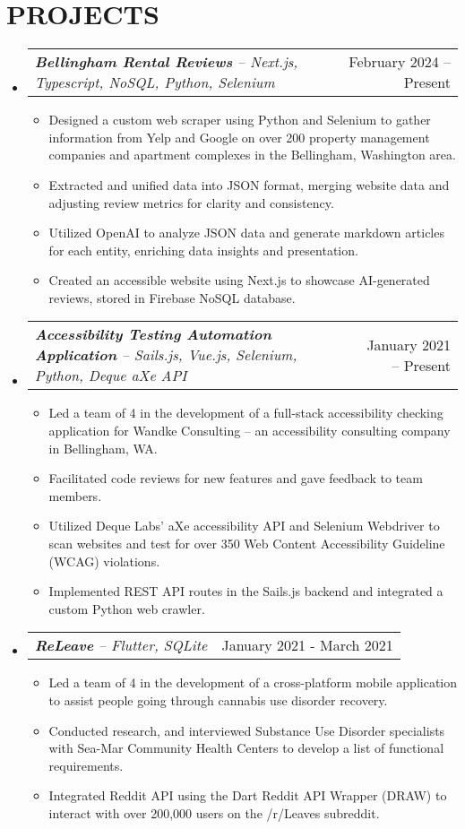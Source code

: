 \documentclass[letterpaper,11pt]{article}
\makeatletter
\newcommand{\resumeItem}[1]{
    \item\small{
            {#1 \vspace{-1pt}}
        }
    }
\newcommand{\resumeProjectHeading}[2]{
    \item
        \begin{tabular*}{\textwidth}{l@{\extracolsep{\fill}}r}
            \textit{\small#1} & {\color{dark-grey}\small #2}\vspace{2pt} \\
        \end{tabular*}\vspace{-5pt}
    }
\newcommand{\resumeSubHeadingListStart}{\begin{itemize}[leftmargin=0in, label={}]}
\newcommand{\resumeSubHeadingListEnd}{\end{itemize}}
\newcommand{\resumeItemListStart}{\begin{itemize}}
\newcommand{\resumeItemListEnd}{\end{itemize}\vspace{0pt}}
\makeatother
\begin{document}
\section{PROJECTS}
\resumeSubHeadingListStart
    \resumeProjectHeading{\textbf{Bellingham Rental Reviews} -- Next.js, Typescript, NoSQL, Python, Selenium}{February 2024 -- Present}
    \resumeItemListStart
        \resumeItem{Designed a custom web scraper using Python and Selenium to gather information from Yelp and Google on over 200 property management companies and apartment complexes in the Bellingham, Washington area.}
        \resumeItem{Extracted and unified data into JSON format, merging website data and adjusting review metrics for clarity and consistency.}
        \resumeItem{Utilized OpenAI to analyze JSON data and generate markdown articles for each entity, enriching data insights and presentation.}
        \resumeItem{Created an accessible website using Next.js to showcase AI-generated reviews, stored in Firebase NoSQL database.}
    \resumeItemListEnd

    \resumeProjectHeading{\textbf{Accessibility Testing Automation Application} -- Sails.js, Vue.js, Selenium, Python, Deque aXe API}{January 2021 -- Present}
    \resumeItemListStart
        \resumeItem{Led a team of 4 in the development of a full-stack accessibility checking application for Wandke Consulting -- an accessibility consulting company in Bellingham, WA.}
        \resumeItem{Facilitated code reviews for new features and gave feedback to team members.}
        \resumeItem{Utilized Deque Labs’ aXe accessibility API and Selenium Webdriver to scan websites and test for over 350 Web Content Accessibility Guideline (WCAG) violations.}
        \resumeItem{Implemented REST API routes in the Sails.js backend and integrated a custom Python web crawler.}
    \resumeItemListEnd

    \resumeProjectHeading{\textbf{ReLeave} -- Flutter, SQLite}{January 2021 - March 2021}  
    \resumeItemListStart
        \resumeItem{Led a team of 4 in the development of a cross-platform mobile application to assist people going through cannabis use disorder recovery.}
        \resumeItem{Conducted research, and interviewed Substance Use Disorder specialists with Sea-Mar Community Health Centers to develop a list of functional requirements.}
        \resumeItem{Integrated Reddit API using the Dart Reddit API Wrapper (DRAW) to interact with over 200,000 users on the /r/Leaves subreddit.}
    \resumeItemListEnd

\resumeSubHeadingListEnd
\end{document}
